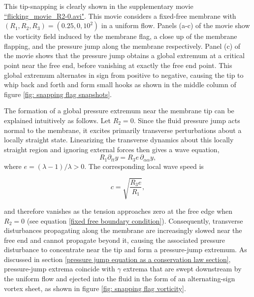 \documentclass{article}[12pt]
\theoremstyle{Theorem}
\begin{document}
This tip-snapping is clearly shown in the supplementary movie \href{https://drive.google.com/file/d/1KGXbDMJiGA9wVuYbdKkdgYOSV8dSV5cg/view?usp=drive_link}{``flicking\_movie\_R2-0.avi"}. This movie considers a fixed-free membrane with $(R_1,R_2,R_3) = (0.25,0,10^2)$ in a uniform flow. Panels (a-c) of the movie show the vorticity field induced by the membrane flag, a close up of the membrane flapping, and the pressure jump along the membrane respectively. Panel (c) of the movie shows that the pressure jump obtains a global extremum at a critical point near the free end, before vanishing at exactly the free end point. This global extremum alternates in sign from positive to negative, causing the tip to whip back and forth and form small hooks as shown in the middle column of figure \ref{fig: snapping flag snapshots}.
\newline

The formation of a global pressure extremum near the membrane tip can be explained intuitively as follows. Let $R_2 = 0$. Since the fluid pressure jump acts normal to the membrane, it excites primarily transverse perturbations about a locally straight state. Linearizing the transverse dynamics about this locally straight region and ignoring external forces then gives a wave equation,
\begin{equation}
R_1\partial_{tt}y = R_3 e\,\partial_{\alpha\alpha}y,
\end{equation}
where $e=(\lambda-1)/\lambda>0$. The corresponding local wave speed is

$$
    c=\sqrt{\frac{R_3 e}{R_1}},
$$

and therefore vanishes as the tension approaches zero at the free edge when $R_2=0$ (see equation \eqref{fixed free boundary condition}). Consequently, transverse disturbances propagating along the membrane are increasingly slowed near the free end and cannot propagate beyond it, causing the associated pressure disturbance to concentrate near the tip and form a pressure-jump extremum. As discussed in section \ref{pressure jump equation as a conservation law section}, pressure-jump extrema coincide with $\gamma$ extrema that are swept downstream by the uniform flow and ejected into the fluid in the form of an alternating-sign vortex sheet, as shown in figure \ref{fig: snapping flag vorticity}.
\newline
\end{document}
